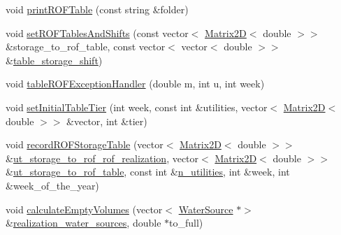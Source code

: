 \begin{DoxyCompactItemize}
void \mbox{\hyperlink{classContinuityModelROF_a1bb8362ce39e694937a787805613e106_a1bb8362ce39e694937a787805613e106}{print\+R\+O\+F\+Table}} (const string \&folder)
\item 
void \mbox{\hyperlink{classContinuityModelROF_a1d3f8b8db62ec7b399095c89ce861163_a1d3f8b8db62ec7b399095c89ce861163}{set\+R\+O\+F\+Tables\+And\+Shifts}} (const vector$<$ \mbox{\hyperlink{classMatrix2D}{Matrix2D}}$<$ double $>$$>$ \&storage\+\_\+to\+\_\+rof\+\_\+table, const vector$<$ vector$<$ double $>$$>$ \&\mbox{\hyperlink{classContinuityModelROF_a1a90c8816944aab36f395e89f7b84c06_a1a90c8816944aab36f395e89f7b84c06}{table\+\_\+storage\+\_\+shift}})
\item 
void \mbox{\hyperlink{classContinuityModelROF_a10a8a95f3177d305d3881e654f01d65d_a10a8a95f3177d305d3881e654f01d65d}{table\+R\+O\+F\+Exception\+Handler}} (double m, int u, int week)
\item 
void \mbox{\hyperlink{classContinuityModelROF_a0c46d5905f5d0ae2cf0abd0d4653bbc7_a0c46d5905f5d0ae2cf0abd0d4653bbc7}{set\+Initial\+Table\+Tier}} (int week, const int \&utilities, vector$<$ \mbox{\hyperlink{classMatrix2D}{Matrix2D}}$<$ double $>$$>$ \&vector, int \&tier)
\item 
void \mbox{\hyperlink{classContinuityModelROF_aa2348a2a5dea751462771ef538243e75_aa2348a2a5dea751462771ef538243e75}{record\+R\+O\+F\+Storage\+Table}} (vector$<$ \mbox{\hyperlink{classMatrix2D}{Matrix2D}}$<$ double $>$$>$ \&\mbox{\hyperlink{classContinuityModelROF_ab4b11938d295e5e74e9cf58725d36a34_ab4b11938d295e5e74e9cf58725d36a34}{ut\+\_\+storage\+\_\+to\+\_\+rof\+\_\+rof\+\_\+realization}}, vector$<$ \mbox{\hyperlink{classMatrix2D}{Matrix2D}}$<$ double $>$$>$ \&\mbox{\hyperlink{classContinuityModelROF_ada25d241caf860255ad00097f5e7adb6_ada25d241caf860255ad00097f5e7adb6}{ut\+\_\+storage\+\_\+to\+\_\+rof\+\_\+table}}, const int \&\mbox{\hyperlink{classContinuityModel_a6df6198ebc99a099df08f4b8ce6b52b9_a6df6198ebc99a099df08f4b8ce6b52b9}{n\+\_\+utilities}}, int \&week, int \&week\+\_\+of\+\_\+the\+\_\+year)
\item 
void \mbox{\hyperlink{classContinuityModelROF_aa720006d12410fc35b8768eda716c149_aa720006d12410fc35b8768eda716c149}{calculate\+Empty\+Volumes}} (vector$<$ \mbox{\hyperlink{classWaterSource}{Water\+Source}} $\ast$$>$ \&\mbox{\hyperlink{classContinuityModelROF_a77048d247b8d1f70fbdd31559b4d3337_a77048d247b8d1f70fbdd31559b4d3337}{realization\+\_\+water\+\_\+sources}}, double $\ast$to\+\_\+full)
\end{DoxyCompactItemize}
